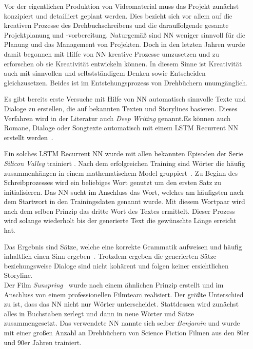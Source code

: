 \documentclass[times, 12pt,twocolumn]{article}
\begin{document}
 \label{sec:Konzeption}
Vor der eigentlichen Produktion von Videomaterial muss das Projekt zunächst konzipiert und detailliert geplant werden. Dies bezieht sich vor allem auf die kreativen Prozesse des Drehbuchschreibens und die darauffolgende gesamte Projektplanung und -vorbereitung. Naturgemäß sind NN weniger sinnvoll für die Planung und das Management von Projekten. Doch in den letzten Jahren wurde damit begonnen mit Hilfe von NN kreative Prozesse umzusetzen und zu erforschen ob sie Kreativität entwickeln können. In diesem Sinne ist Kreativität auch mit sinnvollen und selbstständigem Denken sowie Entscheiden gleichzusetzen. Beides ist im Entstehungsprozess von Drehbüchern unumgänglich.

Es gibt bereits erste Versuche mit Hilfe von NN automatisch sinnvolle Texte und Dialoge zu erstellen, die auf bekannten Texten und Storylines basieren. Dieses Verfahren wird in der Literatur auch \textit{Deep Writing} genannt.Es können auch Romane, Dialoge oder Songtexte automatisch mit einem LSTM Recurrent NN erstellt werden~\cite{DrehbuchWrite}.

 \label{sec:SOTAVorverarbeitung}
Ein solches LSTM Recurrent NN wurde mit allen bekannten Episoden der Serie \textit{Silicon Valley} trainiert \cite{DrehbuchSV}. Nach dem erfolgreichen Training sind Wörter die häufig zusammenhängen in einem mathematischem Model gruppiert~\cite{DrehbuchWrite}. Zu Beginn des Schreibprozesses wird ein beliebiges Wort genutzt um den ersten Satz zu initialisieren. Das NN sucht im Anschluss das Wort, welches am häufigsten nach dem Startwort in den Trainingsdaten genannt wurde. Mit diesem Wortpaar wird nach dem selben Prinzip das dritte Wort des Textes ermittelt. Dieser Prozess wird solange wiederholt bis der generierte Text die gewünschte Länge erreicht hat.

Das Ergebnis sind Sätze, welche eine korrekte Grammatik aufweisen und häufig inhaltlich einen Sinn ergeben~\cite{DrehbuchSV}. Trotzdem ergeben die generierten Sätze beziehungsweise Dialoge sind nicht kohärent und folgen keiner ersichtlichen Storyline. \\

Der Film \textit{Sunspring}~\cite{DrehbuchMovie} wurde nach einem ähnlichen Prinzip erstellt und im Anschluss von einem professionellen Filmteam realisiert. Der größte Unterschied zu \cite{DrehbuchSV} ist, dass das NN nicht nur Wörter unterscheidet. Stattdessen wird zunächst alles in Buchstaben zerlegt und dann in neue Wörter und Sätze zusammengesetzt. Das verwendete NN nannte sich selber \textit{Benjamin} und wurde mit einer großen Anzahl an Drehbüchern von Science Fiction Filmen aus den 80er und 90er Jahren trainiert. 
\end{document}
